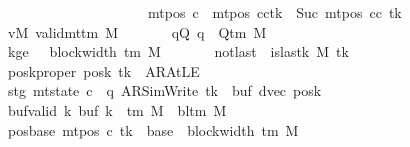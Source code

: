 \begin{isabellebody}
\ \ \ \ \ \ \ \ \ \ \ \ \ \ \ \ \ \ \ \ \ \ \ \ \ \ {\isasymand}\ mt{\isacharunderscore}{\kern0pt}pos\ c{\isacharprime}{\kern0pt}{\isacharprime}{\kern0pt}\ {\isacharequal}{\kern0pt}\ {\isacharparenleft}{\kern0pt}mt{\isacharunderscore}{\kern0pt}pos\ cc{\isacharparenright}{\kern0pt}{\isacharparenleft}{\kern0pt}tk\ {\isacharcolon}{\kern0pt}{\isacharequal}{\kern0pt}\ Suc\ {\isacharparenleft}{\kern0pt}mt{\isacharunderscore}{\kern0pt}pos\ cc\ tk{\isacharparenright}{\kern0pt}{\isacharparenright}{\kern0pt}{\isachardoublequoteclose}\isanewline
\ \ \ \ \ \ \ vM{\isacharcolon}{\kern0pt}\ {\isachardoublequoteopen}valid{\isacharunderscore}{\kern0pt}mttm\ M{\isachardoublequoteclose}\isanewline
\ \ \ \ \ \ \ qQ{\isacharcolon}{\kern0pt}\ {\isachardoublequoteopen}q\ {\isasymin}\ Q{\isacharunderscore}{\kern0pt}tm\ M{\isachardoublequoteclose}\isanewline
\ \ \ \ \ \ \ kge{}{\isacharcolon}{\kern0pt}\ {\isachardoublequoteopen}{}\ {\isasymle}\ block{\isacharunderscore}{\kern0pt}width\ {\isacharparenleft}{\kern0pt}{\isasymGamma}{\isacharunderscore}{\kern0pt}tm\ M{\isacharparenright}{\kern0pt}{\isachardoublequoteclose}\isanewline
\ \ \ \ \ \ \ notlast{\isacharcolon}{\kern0pt}\ {\isachardoublequoteopen}{\isasymnot}\ is{\isacharunderscore}{\kern0pt}last{\isacharunderscore}{\kern0pt}k\ M\ tk{\isachardoublequoteclose}\isanewline
\ \ \ \ \ \ \ poskproper{\isacharcolon}{\kern0pt}\ {\isachardoublequoteopen}posk\ tk\ {\isasymnoteq}\ AR{\isacharunderscore}{\kern0pt}AtLE{\isachardoublequoteclose}\isanewline
\ \ \ \ \ \ \ stg{\isacharcolon}{\kern0pt}\ {\isachardoublequoteopen}mt{\isacharunderscore}{\kern0pt}state\ c{\isacharprime}{\kern0pt}\ {\isacharequal}{\kern0pt}\ {\isacharparenleft}{\kern0pt}q{\isacharcomma}{\kern0pt}\ AR{\isacharunderscore}{\kern0pt}SimWrite{\isacharcomma}{\kern0pt}\ tk{\isacharcomma}{\kern0pt}\ {}{\isacharcomma}{\kern0pt}\ buf{\isacharcomma}{\kern0pt}\ dvec{\isacharcomma}{\kern0pt}\ posk{\isacharparenright}{\kern0pt}{\isachardoublequoteclose}\isanewline
\ \ \ \ \ \ \ buf{\isacharunderscore}{\kern0pt}valid{\isacharcolon}{\kern0pt}\ {\isachardoublequoteopen}{\isasymforall}k{\isachardot}{\kern0pt}\ buf\ k\ {\isasymin}\ {\isasymGamma}{\isacharunderscore}{\kern0pt}tm\ M\ {\isasymunion}\ {\isacharbraceleft}{\kern0pt}bl{\isacharunderscore}{\kern0pt}tm\ M{\isacharbraceright}{\kern0pt}{\isachardoublequoteclose}\isanewline
\ \ \ \ \ \ \ pos{\isacharunderscore}{\kern0pt}base{\isacharcolon}{\kern0pt}\ {\isachardoublequoteopen}mt{\isacharunderscore}{\kern0pt}pos\ c{\isacharprime}{\kern0pt}\ tk\ {\isacharequal}{\kern0pt}\ base\ {\isacharplus}{\kern0pt}\ block{\isacharunderscore}{\kern0pt}width\ {\isacharparenleft}{\kern0pt}{\isasymGamma}{\isacharunderscore}{\kern0pt}tm\ M{\isacharparenright}{\kern0pt}{\isachardoublequoteclose}\isanewline

\end{isabellebody}
